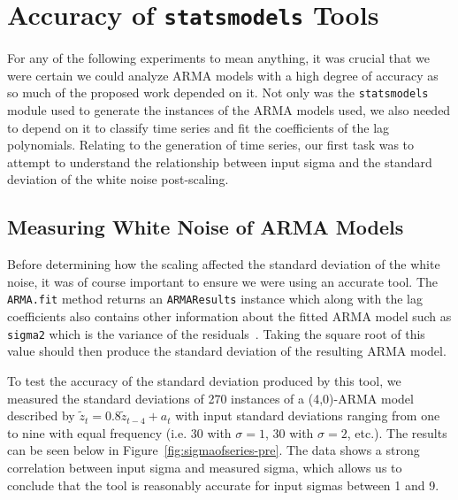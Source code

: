 \documentclass[oneside,12pt,openany]{book}
\begin{document}
    \section{Accuracy of \texttt{statsmodels} Tools}\label{sec:res:stats}
    
     For any of the following experiments to mean anything, it was crucial that we were certain we could analyze ARMA models with a high degree of accuracy as so much of the proposed work depended on it. Not only was the \texttt{statsmodels} module used to generate the instances of the ARMA models used, we also needed to depend on it to classify time series and fit the coefficients of the lag polynomials. Relating to the generation of time series, our first task was to attempt to understand the relationship between input sigma and the standard deviation of the white noise post-scaling.
    
   \subsection{Measuring White Noise of ARMA Models}
   
   Before determining how the scaling affected the standard deviation of the white noise, it was of course important to ensure we were using an accurate tool. The \texttt{ARMA.fit} method returns an \texttt{ARMAResults} instance which along with the lag coefficients also contains other information about the fitted ARMA model such as \texttt{sigma2} which is the variance of the residuals~\cite{statsmodels}. Taking the square root of this value should then produce the standard deviation of the resulting ARMA model.
   
   To test the accuracy of the standard deviation produced by this tool, we measured the standard deviations of 270 instances of a (4,0)-ARMA model described by $\tilde{z}_{t}=0.8\tilde{z}_{t-4}+a_{t}$ with input standard deviations ranging from one to nine with equal frequency (i.e. 30 with $\sigma=1$, 30 with $\sigma=2$, etc.). The results can be seen below in Figure~\ref{fig:sigmaofseries-pre}. The data shows a strong correlation between input sigma and measured sigma, which allows us to conclude that the tool is reasonably accurate for input sigmas between 1 and 9.
    
\end{document}
